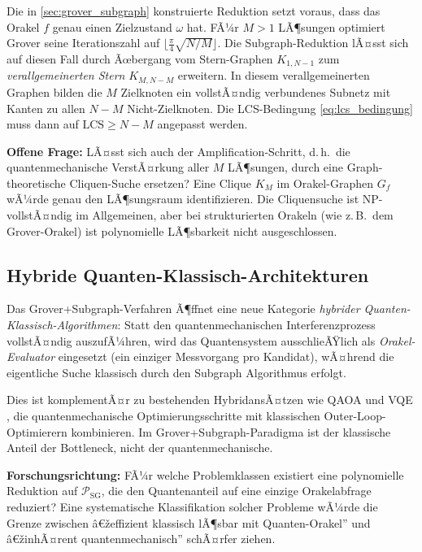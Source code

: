 ﻿\documentclass[11pt,a4paper]{article}
\theoremstyle{definition}
\begin{document}
Die in \cref{sec:grover_subgraph} konstruierte Reduktion setzt voraus, dass
das Orakel $f$ genau einen Zielzustand $\omega$ hat.  FÃ¼r $M > 1$ LÃ¶sungen
optimiert Grover seine Iterationszahl auf $\lfloor\tfrac{\pi}{4}\sqrt{N/M}\rfloor$.
Die Subgraph-Reduktion lÃ¤sst sich auf diesen Fall durch Ãœbergang vom Stern-Graphen
$K_{1,N-1}$ zum \emph{verallgemeinerten Stern} $K_{M,N-M}$ erweitern.
In diesem verallgemeinerten Graphen bilden die $M$ Zielknoten ein vollstÃ¤ndig
verbundenes Subnetz mit Kanten zu allen $N-M$ Nicht-Zielknoten.  Die
LCS-Bedingung \eqref{eq:lcs_bedingung} muss dann auf
$\mathrm{LCS} \geq N-M$ angepasst werden.

\textbf{Offene Frage:}  LÃ¤sst sich auch der Amplification-Schritt, d.\,h.\ die
quantenmechanische VerstÃ¤rkung aller $M$ LÃ¶sungen, durch eine Graph-theoretische
Cliquen-Suche ersetzen?  Eine Clique $K_M$ im Orakel-Graphen $G_f$ wÃ¼rde genau
den LÃ¶sungsraum identifizieren.  Die Cliquensuche ist NP-vollstÃ¤ndig im
Allgemeinen, aber bei strukturierten Orakeln (wie z.\,B.\ dem Grover-Orakel)
ist polynomielle LÃ¶sbarkeit nicht ausgeschlossen.

\subsection{Hybride Quanten-Klassisch-Architekturen}
\label{subsec:outlook_hybrid}

Das Grover+Subgraph-Verfahren Ã¶ffnet eine neue Kategorie
\emph{hybrider Quanten-Klassisch-Algorith\-men}:  Statt den quantenmechanischen
Interferenzprozess vollstÃ¤ndig auszufÃ¼hren, wird das Quantensystem ausschlieÃŸlich
als \emph{Orakel-Evaluator} eingesetzt (ein einziger Messvorgang pro Kandidat),
wÃ¤hrend die eigentliche Suche klassisch durch den Subgraph Algorithmus erfolgt.

Dies ist komplementÃ¤r zu bestehenden HybridansÃ¤tzen wie QAOA \cite{Farhi2014}
und VQE \cite{Peruzzo2014}, die quantenmechanische Optimierungsschritte
mit klassischen Outer-Loop-Optimierern kombinieren.  Im Grover+Subgraph-Paradigma
ist der klassische Anteil der Bottleneck, nicht der quantenmechanische.

\textbf{Forschungsrichtung:}  FÃ¼r welche Problemklassen existiert eine
polynomielle Reduktion auf $\mathcal{P}_{\mathrm{SG}}$, die den Quantenanteil
auf eine einzige Orakelabfrage reduziert?  Eine systematische Klassifikation
solcher Probleme wÃ¼rde die Grenze zwischen â€žeffizient klassisch lÃ¶sbar mit
Quanten-Orakel'' und â€žinhÃ¤rent quantenmechanisch'' schÃ¤rfer ziehen.
\end{document}
